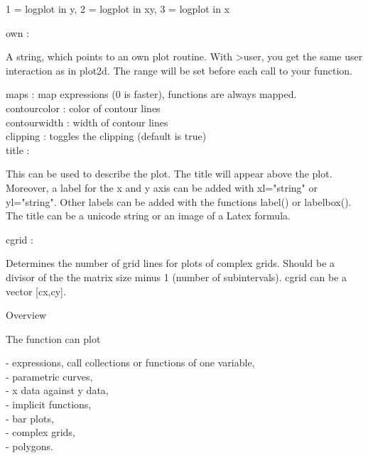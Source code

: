 \documentclass[a4paper,10pt]{article}
\begin{document}
\begin{eulernotebook}
\begin{eulercomment}
\begin{eulercomment}
\begin{eulercomment}
\begin{eulercomment}
\begin{eulerttcomment}
            1 = logplot in y,
            2 = logplot in xy,
            3 = logplot in x
\end{eulerttcomment}
\begin{eulercomment}
own       :\\
\end{eulercomment}
\begin{eulerttcomment}
  A string, which points to an own plot routine. With >user, you get
  the same user interaction as in plot2d. The range will be set
  before each call to your function.
\end{eulerttcomment}
\begin{eulercomment}
maps      : map expressions (0 is faster), functions are always mapped.\\
contourcolor : color of contour lines\\
contourwidth : width of contour lines\\
clipping  : toggles the clipping (default is true)\\
title     :\\
\end{eulercomment}
\begin{eulerttcomment}
  This can be used to describe the plot. The title will appear above
  the plot. Moreover, a label for the x and y axis can be added with
  xl="string" or yl="string". Other labels can be added with the
  functions label() or labelbox(). The title can be a unicode
  string or an image of a Latex formula.
\end{eulerttcomment}
\begin{eulercomment}
cgrid     :\\
\end{eulercomment}
\begin{eulerttcomment}
  Determines the number of grid lines for plots of complex grids.
  Should be a divisor of the the matrix size minus 1 (number of
  subintervals). cgrid can be a vector [cx,cy].
\end{eulerttcomment}
\begin{eulercomment}

Overview

The function can plot

- expressions, call collections or functions of one variable,\\
- parametric curves,\\
- x data against y data,\\
- implicit functions,\\
- bar plots,\\
- complex grids,\\
- polygons.


\end{eulercomment}
\end{eulercomment}
\end{eulercomment}
\end{eulercomment}
\end{eulercomment}
\end{eulernotebook}
\end{document}
